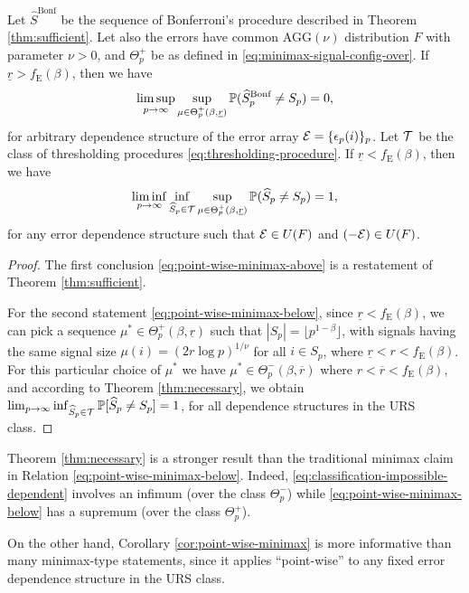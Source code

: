 \begin{corollary}
\label{cor:point-wise-minimax}
Let $\widehat{S}^{\text{Bonf}}$ be the sequence of Bonferroni's procedure described in Theorem \ref{thm:sufficient}. 
Let also the errors have common $\text{AGG}(\nu)$ distribution $F$ with parameter $\nu>0$, and $\Theta_p^+$ be as defined in \eqref{eq:minimax-signal-config-over}.
If $\underline{r}>f_{\mathrm{E}}(\beta)$, then we have
\begin{equation} \label{eq:point-wise-minimax-above}
    \limsup_{p\to\infty} \sup_{\mu\in\Theta_p^+(\beta, \underline{r})} \P(\widehat{S}^{\text{Bonf}}_p \neq S_p) = 0,
\end{equation}
for arbitrary dependence structure of the error array ${\cal E} = \{\epsilon_p(i)\}_p$.
Let $\cal T$ be the class of thresholding procedures \eqref{eq:thresholding-procedure}. 
If $\underline{r}<f_{\mathrm{E}}(\beta)$, then we have
\begin{equation} \label{eq:point-wise-minimax-below}
    \liminf_{p\to\infty} \inf_{\widehat{S}_p\in \cal T} \sup_{\mu\in\Theta_p^+(\beta, \underline{r})} \P(\widehat{S}_p \neq S_p) = 1,
\end{equation}
for any error dependence structure such that ${\cal E}\in U(F)$ and ${(-\cal E)}\in U(F)$.
\end{corollary}

\begin{proof}%
The first conclusion \eqref{eq:point-wise-minimax-above} is a restatement of Theorem \ref{thm:sufficient}.

For the second statement \eqref{eq:point-wise-minimax-below}, since $\underline{r}<f_{\mathrm{E}}(\beta)$, we can pick a sequence $\mu^*\in\Theta_p^+(\beta, \underline{r})$ such that $|S_p| = \lfloor p^{1-\beta}\rfloor$, with signals having the same signal size $\mu(i)=(2r\log{p})^{1/\nu}$ for all $i\in S_p$, where $\underline{r}<{r}<f_{\mathrm{E}}(\beta)$.
For this particular choice of $\mu^*$ we have $\mu^*\in\Theta_p^-(\beta, \overline{r})$ where $r<\overline{r}<f_{\mathrm{E}}(\beta)$,
and according to Theorem \ref{thm:necessary}, we obtain $\lim_{p\to\infty} \inf_{\widehat{S}_p\in \cal T} \mathbb P[\widehat{S}_p \neq S_p] = 1$, for all dependence structures in the URS class.
\end{proof}

\begin{remark}
Theorem \ref{thm:necessary} is a stronger result than the traditional minimax claim in Relation \eqref{eq:point-wise-minimax-below}.
Indeed,  \eqref{eq:classification-impossible-dependent} involves an infimum (over the class $\Theta^-_p$) while \eqref{eq:point-wise-minimax-below} has a supremum (over the class $\Theta^+_p$).

On the other hand, Corollary \ref{cor:point-wise-minimax} is more informative than many minimax-type statements, since it applies ``point-wise'' to any fixed error dependence structure in the URS class.
\end{remark}

